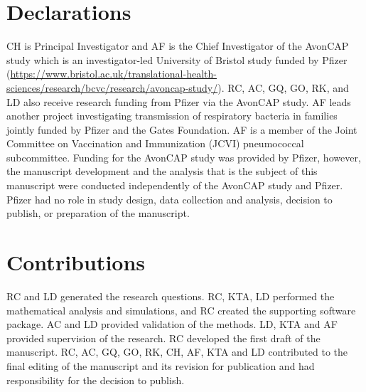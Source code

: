 \documentclass[10pt,letterpaper]{article}
\begin{document}
\section*{Declarations}

CH is Principal Investigator and AF is the Chief Investigator of the AvonCAP study which is an investigator-led University of Bristol study funded by Pfizer (\url{https://www.bristol.ac.uk/translational-health-sciences/research/bcvc/research/avoncap-study/}). RC, AC, GQ, GO, RK, and LD also receive research funding from Pfizer via the AvonCAP study. AF leads another project investigating transmission of respiratory bacteria in families jointly funded by Pfizer and the Gates Foundation. AF is a member of the Joint Committee on Vaccination and Immunization (JCVI) pneumococcal subcommittee. Funding for the AvonCAP study was provided by Pfizer, however, the manuscript development and the analysis that is the subject of this manuscript were conducted independently of the AvonCAP study and Pfizer. Pfizer had no role in study design, data collection and analysis, decision to publish, or preparation of the manuscript.

\section*{Contributions}

RC and LD generated the research questions. RC, KTA, LD performed the mathematical analysis and simulations, and RC created the supporting software package. AC and LD provided validation of the methods. LD, KTA and AF provided supervision of the research. RC developed the first draft of the manuscript. RC, AC, GQ, GO, RK, CH, AF, KTA and LD contributed to the final editing of the manuscript and its revision for publication and had responsibility for the decision to publish.

\nolinenumbers


\end{document}
